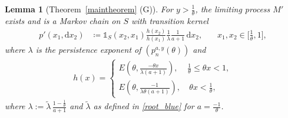 \documentclass[12pt]{article}
\newcommand{\E}{\mathbb{E}} %
\newcommand{\1}{\mathds{1}}
\renewcommand{\d}{\mathrm{d}}
\theoremstyle{definition}
\theoremstyle{plain}
\newtheorem{Lemma}[definition]{Lemma}
\theoremstyle{remark}
\begin{document}
\begin{Lemma}[Theorem~\ref{maintheorem} (G)]
    For $y>\frac{1}{\theta}$, the limiting process $M'$ exists and is a Markov chain on $S$ with transition kernel
    \begin{align*}
    p'(x_1,\d x_2)&\coloneqq\mathds{1}_S(x_2,x_1)\frac{h(x_2)}{h(x_{1})}\frac{1}{\lambda}\frac{1}{a+1}\,\d x_2,~~~~~~~~x_1,x_2\in \bigg[\frac{1}{\theta},1\bigg],
\end{align*}
where $\lambda$ is the persistence exponent of $(p_n^{a,y}(\theta))$ and 
\begin{align*}
         h(x)=\begin{cases}
           E\left(\theta,\frac{-\theta x}{\lambda (a+1)}\right),&\frac{1}{\theta}\leq \theta x< 1,
            \\E\left(\theta,\frac{-1}{ \lambda \theta(a+1)}\right),&~ \theta x< \frac{1}{\theta},
        \end{cases}
    \end{align*}
where $\lambda:=\tilde \lambda \, \frac{1-\frac{1}{\theta}}{a+1}$ and $\tilde\lambda$ as defined in \eqref{root_blue} for $a=\frac{-1}{\theta}$.
\end{Lemma}
\end{document}
